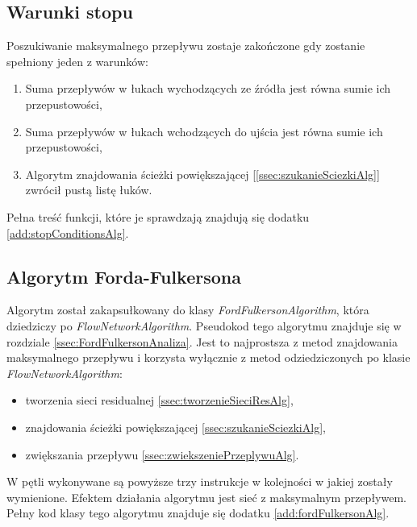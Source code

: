 \subsection{Warunki stopu}
Poszukiwanie maksymalnego przepływu zostaje zakończone gdy zostanie spełniony jeden z warunków:
\begin{enumerate}
	\item Suma przepływów w łukach wychodzących ze źródła jest równa sumie ich przepustowości,
	\item Suma przepływów w łukach wchodzących do ujścia jest równa sumie ich przepustowości,
	\item Algorytm znajdowania ścieżki powiększającej [\ref{ssec:szukanieSciezkiAlg}] zwrócił pustą listę łuków.
\end{enumerate}
Pełna treść funkcji, które je sprawdzają znajdują się dodatku \ref{add:stopConditionsAlg}.

\subsection{Algorytm Forda-Fulkersona}\label{ssec:fordFulkersonWew}
Algorytm został zakapsułkowany do klasy \emph{FordFulkersonAlgorithm}, która dziedziczy po \emph{FlowNetworkAlgorithm}. Pseudokod tego algorytmu znajduje się w rozdziale \ref{ssec:FordFulkersonAnaliza}. Jest to najprostsza z metod znajdowania maksymalnego przepływu i korzysta wyłącznie z metod odziedziczonych po klasie \emph{FlowNetworkAlgorithm}:
\begin{itemize}
	\item tworzenia sieci residualnej \ref{ssec:tworzenieSieciResAlg},
	\item znajdowania ścieżki powiększającej \ref{ssec:szukanieSciezkiAlg},
	\item zwiększania przepływu \ref{ssec:zwiekszeniePrzeplywuAlg}.
\end{itemize}
W pętli wykonywane są powyższe trzy instrukcje w kolejności w jakiej zostały wymienione. Efektem działania algorytmu jest sieć z maksymalnym przepływem. Pełny kod klasy tego algorytmu znajduje się dodatku \ref{add:fordFulkersonAlg}.
